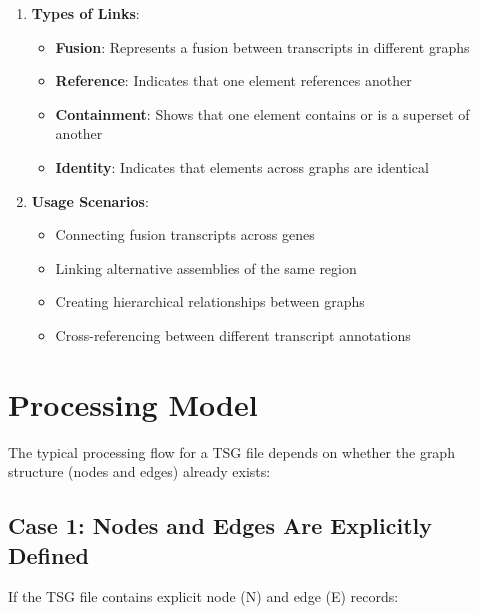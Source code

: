 \documentclass[11pt,a4paper]{article}
\begin{document}
\begin{enumerate}[leftmargin=*]
	\item \textbf{Types of Links}:
	      \begin{itemize}
		      \item \textbf{Fusion}: Represents a fusion between transcripts in different graphs
		      \item \textbf{Reference}: Indicates that one element references another
		      \item \textbf{Containment}: Shows that one element contains or is a superset of another
		      \item \textbf{Identity}: Indicates that elements across graphs are identical
	      \end{itemize}

	\item \textbf{Usage Scenarios}:
	      \begin{itemize}
		      \item Connecting fusion transcripts across genes
		      \item Linking alternative assemblies of the same region
		      \item Creating hierarchical relationships between graphs
		      \item Cross-referencing between different transcript annotations
	      \end{itemize}
\end{enumerate}

\section{Processing Model}

The typical processing flow for a TSG file depends on whether the graph structure (nodes and edges) already exists:

\subsection{Case 1: Nodes and Edges Are Explicitly Defined}

If the TSG file contains explicit node (N) and edge (E) records:
\end{document}
